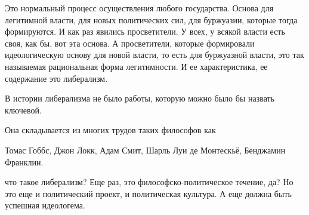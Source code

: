
Это нормальный процесс осуществления любого государства. Основа
для легитимной власти, для новых политических сил, для буржуазии, которые тогда
формируются. И как раз явились просветители. У всех, у всякой власти есть своя,
как бы, вот эта основа. А просветители, которые формировали идеологическую
основу для новой власти, то есть для буржуазной власти, это так называемая
рациональная форма легитимности. И ее характеристика, ее содержание это
либерализм. 

В истории либерализма не было работы, которую можно было бы назвать
ключевой. 

Она складывается из многих трудов таких философов как


Томас Гоббс, Джон Локк, Адам Смит,
Шарль Луи де Монтескьё, Бенджамин Франклин. 


что такое
либерализм? Еще раз, это философско-политическое течение, да? Но это еще и
политический проект, и политическая культура. А еще должна
быть успешная идеологема.



